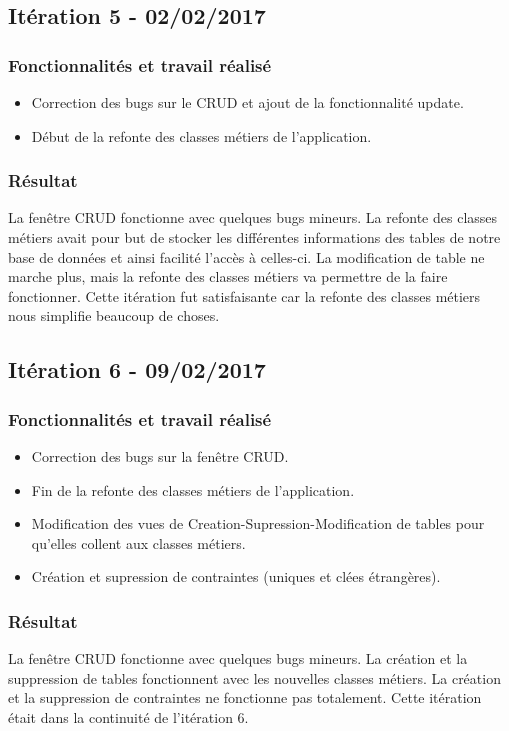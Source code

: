 \subsection{Itération 5 - 02/02/2017}
\subsubsection{Fonctionnalités et travail réalisé}
\begin{itemize}
\item Correction des bugs sur le CRUD et ajout de la fonctionnalité update.
\item Début de la refonte des classes métiers de l'application.
\end{itemize}

\subsubsection{Résultat}
La fenêtre CRUD fonctionne avec quelques bugs mineurs.
La refonte des classes métiers avait pour but de stocker les différentes informations des tables de notre base de données et ainsi facilité l'accès à celles-ci.
La modification de table ne marche plus, mais la refonte des classes métiers va permettre de la faire fonctionner.
Cette itération fut satisfaisante car la refonte des classes métiers nous simplifie beaucoup de choses. 

\subsection{Itération 6 - 09/02/2017}
\subsubsection{Fonctionnalités et travail réalisé}
\begin{itemize}
\item Correction des bugs sur la fenêtre CRUD.
\item Fin de la refonte des classes métiers de l'application.
\item Modification des vues de Creation-Supression-Modification de tables pour qu'elles collent aux classes métiers.
\item Création et supression de contraintes (uniques et clées étrangères).
\end{itemize}

\subsubsection{Résultat}
La fenêtre CRUD fonctionne avec quelques bugs mineurs.
La création et la suppression de tables fonctionnent avec les nouvelles classes métiers.
La création et la suppression de contraintes ne fonctionne pas totalement.
Cette itération était dans la continuité de l'itération 6. 

